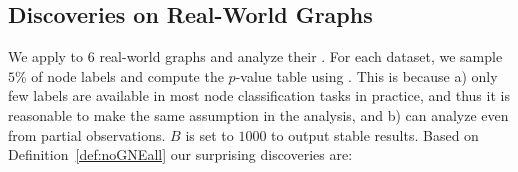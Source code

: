 


\subsection{Discoveries on Real-World Graphs} \label{ssec:discover}

We apply \methodtest to $6$ real-world graphs and analyze their \nef.
For each dataset, we sample $5$\% of node labels and compute the $p$-value table using \methodtest.
This is because 
a) only few labels are available in most node classification tasks in practice, and thus it is reasonable to make the same assumption in the analysis, and 
b) \methodtest can analyze \nef even from partial observations.
$B$ is set to $1000$ to output stable results.
Based on Definition~\ref{def:noGNEall} %
our surprising discoveries are:

